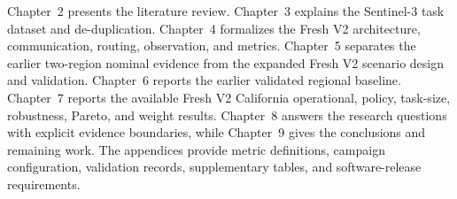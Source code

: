 Chapter~2 presents the literature review. Chapter~3 explains the Sentinel-3 task dataset and de-duplication. Chapter~4 formalizes the Fresh V2 architecture, communication, routing, observation, and metrics. Chapter~5 separates the earlier two-region nominal evidence from the expanded Fresh V2 scenario design and validation. Chapter~6 reports the earlier validated regional baseline. Chapter~7 reports the available Fresh V2 California operational, policy, task-size, robustness, Pareto, and weight results. Chapter~8 answers the research questions with explicit evidence boundaries, while Chapter~9 gives the conclusions and remaining work. The appendices provide metric definitions, campaign configuration, validation records, supplementary tables, and software-release requirements.
